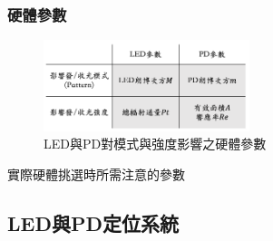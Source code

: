         \subsubsection{硬體參數}

        \begin{figure}[ht]
            \caption{LED與PD對模式與強度影響之硬體參數}
            \label{tab:hardwarepara}
            \centering
            \includegraphics[width=6cm]{ch2pic/tab_hardwarepara.png}
        \end{figure}

        實際硬體挑選時所需注意的參數
        


   

        
        
        
        
        
        


        



    \subsection{LED與PD定位系統}

